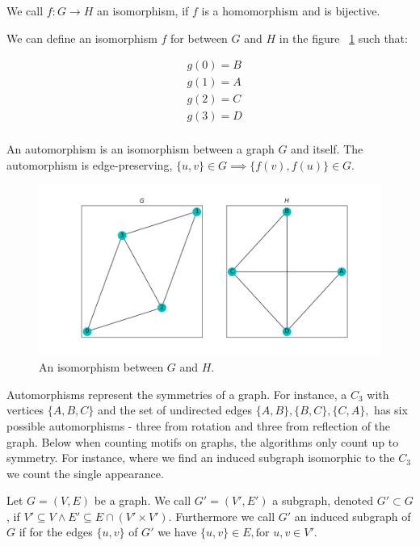 \begin{dfn}
    We call $f: G \rightarrow H$ an isomorphism,
 if $f$ is a homomorphism and is bijective.
\end{dfn}

\noindent We can define an isomorphism $f$ for between $G$ and $H$ in the figure ~\ref{fig:isomorphism} such that:

\begin{align*}
    &g(0) = B\\
    &g(1) = A\\
    &g(2) = C\\
    &g(3) = D\\ 
\end{align*}

\begin{dfn}
    An automorphism is an isomorphism between a graph $G$ and itself. The automorphism 
    is edge-preserving, $\{u,v\} \in G \implies \{f(v),f(u)\} \in G$.
\end{dfn}

\begin{figure}[h!]
    \includegraphics[width=12cm]{Images/graph_isomoprhism.png}
    \centering
    \caption{An isomorphism between $G$ and $H$.}
    \label{fig:isomorphism}
\end{figure}

Automorphisms represent the symmetries of a graph. For instance, a $C_3$ with vertices $\{A, B, C\}$
and the set of undirected edges $\{A,B\},\{B,C\},\{C,A\},$ has six possible automorphisms - three from rotation 
and three from reflection of the graph. Below when counting motifs on graphs, the algorithms only count up to symmetry.
For instance, where we find an induced subgraph isomorphic to the $C_3$ we count the single appearance. 


\begin{dfn}
    Let $G=(V,E)$ be a graph. We call $G'=(V',E')$ a subgraph, denoted $G' \subset G$, if
     $V' \subseteq V \land E' \subseteq E \cap (V' \times V')$. Furthermore we call $G'$
     an induced subgraph of $G$ if for the edges $\{u,v\}$ of $G'$ we have $\{u,v\} \in E, \text{for } u,v \in V'$.
\end{dfn}

